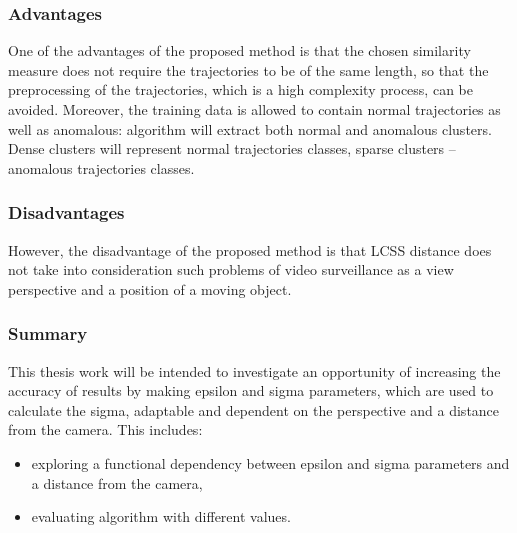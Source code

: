 \subsubsection{Advantages}
One of the advantages of the proposed method is that the chosen similarity measure does not require the trajectories to be of the same length, so that the preprocessing of the trajectories, which is a high complexity process, can be avoided. Moreover, the training data is allowed to contain normal trajectories as well as anomalous: algorithm will extract both normal and anomalous clusters. Dense clusters will represent normal trajectories classes, sparse clusters – anomalous trajectories classes.

\subsubsection{Disadvantages}
However, the disadvantage of the proposed method is that LCSS distance does not take into consideration such problems of video surveillance as a view perspective and a position of a moving object. 

\subsubsection{Summary}
This thesis work will be intended to investigate an opportunity of increasing the accuracy of results by making epsilon and sigma parameters, which are used to calculate the sigma, adaptable and dependent on the perspective and a distance from the camera. This includes:
\begin{itemize}
	\item exploring a functional dependency between epsilon and sigma parameters and a distance from the camera,
	\item evaluating algorithm with different values.
\end{itemize}